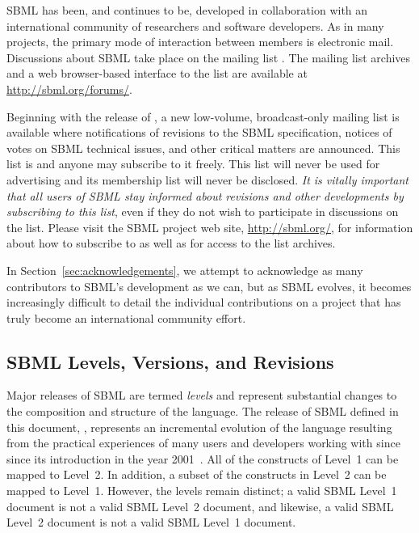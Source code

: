 
SBML has been, and continues to be, developed in collaboration
with an international community of researchers and software
developers.  As in many projects, the primary mode of interaction
between members is electronic mail.  Discussions about SBML take
place on the mailing list
.  The
mailing list archives and a web browser-based interface to the
list are available at \url{http://sbml.org/forums/}.

Beginning with the release of \sbmltwotwo, a new low-volume,
broadcast-only mailing list is available where notifications of
revisions to the SBML specification, notices of votes on SBML
technical issues, and other critical matters are announced.  This
list is 
and anyone may subscribe to it freely.  This list will never be
used for advertising and its membership list will never be
disclosed.  \emph{It is vitally important that all users of SBML
  stay informed about revisions and other developments by
  subscribing to this list}, even if they do not wish to
participate in discussions on the
 list.
Please visit the SBML project web site, \url{http://sbml.org/},
for information about how to subscribe to
 as well
as for access to the list archives.

In Section~\ref{sec:acknowledgements}, we attempt to acknowledge
as many contributors to SBML's development as we can, but as SBML
evolves, it becomes increasingly difficult to detail the
individual contributions on a project that has truly become an
international community effort.


\subsection{SBML Levels, Versions, and Revisions}
\label{sec:levels-versions-revisions}

Major releases of SBML are termed \emph{levels} and represent
substantial changes to the composition and structure of the
language.  The release of SBML defined in this document, \sbmltwo,
represents an incremental evolution of the language resulting from
the practical experiences of many users and developers working
with \sbmlone since since its introduction in the year
2001~\citep{hucka:2001,hucka:2003}.  All of the constructs of
Level~1 can be mapped to Level~2.  In addition, a subset of the
constructs in Level~2 can be mapped to Level~1.  However, the
levels remain distinct; a valid SBML Level~1 document is not a
valid SBML Level~2 document, and likewise, a valid SBML Level~2
document is not a valid SBML Level~1 document.

